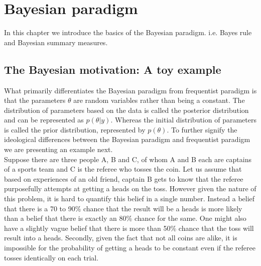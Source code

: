 
\chapter{Bayesian paradigm}
\label{ch : bayesian_paradigm}
In this chapter we introduce the basics of the Bayesian paradigm. i.e. Bayes rule and Bayesian summary measures. 

\section{The Bayesian motivation: A toy example}
What primarily differentiates the Bayesian paradigm from frequentist paradigm is that the parameters $\theta$ are random variables rather than being a constant. The distribution of parameters based on the data is called the posterior distribution and can be represented as $p(\theta|y)$. Whereas the initial distribution of parameters is called the prior distribution, represented by $p(\theta)$. To further signify the ideological differences between the Bayesian paradigm and frequentist paradigm we are presenting an example next.\\

Suppose there are three people A, B and C, of whom A and B each are captains of a sports team and C is the referee who tosses the coin. Let us assume that based on experiences of an old friend, captain B gets to know that the referee purposefully attempts at getting a heads on the toss. However given the nature of this problem, it is hard to quantify this belief in a single number. Instead a belief that there is a 70 to 90\% chance that the result will be a heads is more likely than a belief that there is exactly an 80\% chance for the same. One might also have a slightly vague belief that there is more than 50\% chance that the toss will result into a heads. Secondly, given the fact that not all coins are alike, it is impossible for the probability of getting a heads to be constant even if the referee tosses identically on each trial.\\


